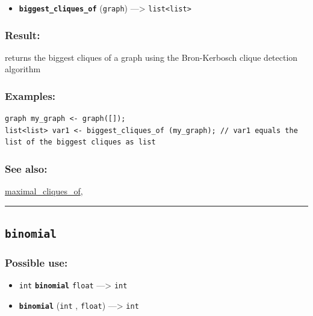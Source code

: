 \documentclass[]{book}
\providecommand{\tightlist}{%
  \setlength{\itemsep}{0pt}\setlength{\parskip}{0pt}}
\theoremstyle{definition}
\theoremstyle{definition}
\theoremstyle{definition}
\theoremstyle{remark}
\begin{document}
\begin{itemize}
\tightlist
\item
  \textbf{\texttt{biggest\_cliques\_of}} (\texttt{graph})
  ---\textgreater{} \texttt{list\textless{}list\textgreater{}}
\end{itemize}

\subsubsection{Result:}\label{result-68}

returns the biggest cliques of a graph using the Bron-Kerbosch clique
detection algorithm

\subsubsection{Examples:}\label{examples-55}

\begin{verbatim}
graph my_graph <- graph([]);  
list<list> var1 <- biggest_cliques_of (my_graph); // var1 equals the list of the biggest cliques as list
\end{verbatim}

\subsubsection{See also:}\label{see-also-44}

\href{operators-i-to-m.html\#maximal_cliques_of}{maximal\_cliques\_of},

\begin{center}\rule{0.5\linewidth}{\linethickness}\end{center}

\subsection{\texorpdfstring{\texttt{binomial}}{binomial}}\label{binomial}

\subsubsection{Possible use:}\label{possible-use-70}

\begin{itemize}
\tightlist
\item
  \texttt{int} \textbf{\texttt{binomial}} \texttt{float}
  ---\textgreater{} \texttt{int}
\item
  \textbf{\texttt{binomial}} (\texttt{int} , \texttt{float})
  ---\textgreater{} \texttt{int}
\end{itemize}
\end{document}
